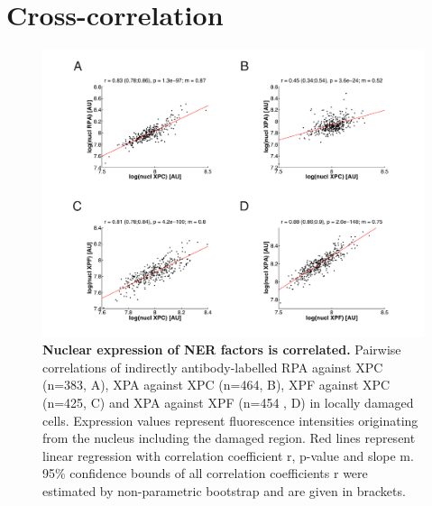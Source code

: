 \newpage
\section{Cross-correlation}

\begin{figure}[h!]
	\begin{center}
		\includegraphics[width=1\textwidth]{Abbildungen/figure_A_2.pdf}
		\caption{\textbf{Nuclear expression of NER factors is correlated.} Pairwise correlations of indirectly antibody-labelled RPA against XPC (n=383, A), XPA against XPC (n=464, B), XPF against XPC (n=425, C) and XPA against XPF (n=454 , D) in locally damaged cells. Expression values represent fluorescence intensities originating from the nucleus including the damaged region. Red lines represent linear regression with correlation coefficient r, p-value and slope m. 95\% confidence bounds of all correlation coefficients r were estimated by non-parametric bootstrap and are given in brackets. }
		\label{fig:nuklearCrosscorrelation}
	\end{center}
\end{figure}
